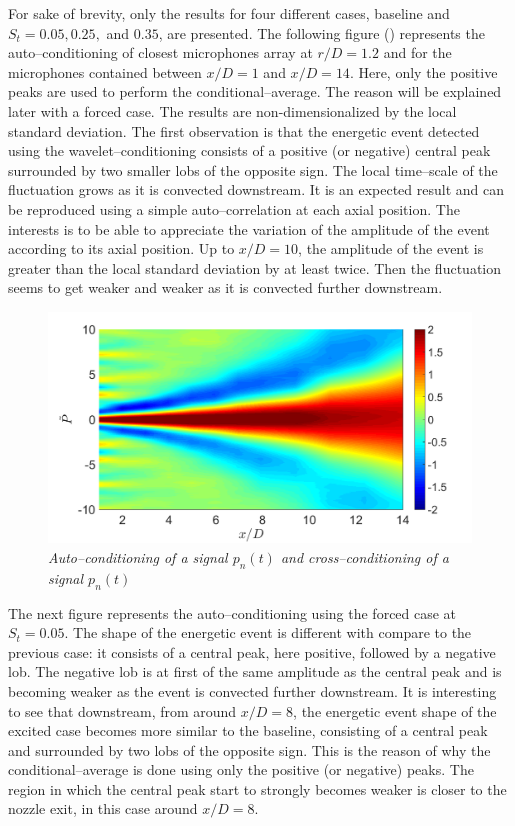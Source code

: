 For sake of brevity, only the results for four different cases, baseline and $S_t = 0.05, 0.25,$ and $0.35$, are presented. The following figure () represents the auto--conditioning of closest microphones array at $r/D = 1.2$ and for the microphones contained between $x/D=1$ and $x/D=14$. Here, only the positive peaks are used to perform the conditional--average. The reason will be explained later with a forced case. The results are non-dimensionalized by the local standard deviation. The first observation is that the energetic event detected using the wavelet--conditioning consists of a positive (or negative) central peak surrounded by two smaller lobs of the opposite sign. The local time--scale of the fluctuation grows as it is convected downstream. It is an expected result and can be reproduced using a simple auto--correlation at each axial position. The interests is to be able to appreciate the variation of the amplitude of the event according to its axial position. Up to $x/D=10$, the amplitude of the event is greater than the local standard deviation by at least twice. Then the fluctuation seems to get weaker and weaker as it is convected further downstream. 

\begin{figure}
	\centering
	\includegraphics[width=1\textwidth]{Figures/conditioning/autoCondSt0p00.png}
	\caption{\textit{Auto--conditioning of a signal $p_n(t)$ and cross--conditioning of a signal $p_n(t)$}}
	\label{fig:autoCondSt0p00}
\end{figure}

The next figure  represents the auto--conditioning using the forced case at $S_t = 0.05$. The shape of the energetic event is different with compare to the previous case: it consists of a central peak, here positive, followed by a negative lob. The negative lob is at first of the same amplitude as the central peak and is becoming weaker as the event is convected further downstream. It is interesting to see that downstream, from around $x/D=8$, the energetic event shape of the excited case becomes more similar to the baseline, consisting of a central peak and surrounded by two lobs of the opposite sign. This is the reason of why the conditional--average is done using only the positive (or negative) peaks. The region in which the central peak start to strongly becomes weaker is closer to the nozzle exit, in this case around $x/D = 8$. 


